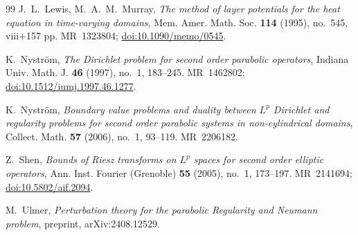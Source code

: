 \documentclass[12pt,leqno]{amsart}
\numberwithin{equation}{section}
\theoremstyle{plain}
\theoremstyle{remark}
\begin{document}
\begin{thebibliography}{99}
 J.~L.~Lewis, M.~A.~M.~Murray, \emph{The method of layer potentials
for the heat equation in time-varying domains}, Mem. Amer. Math. Soc.
\textbf{114} (1995), no.~545, viii+157 pp. MR~1323804;
\href{https://doi.org/10.1090/memo/0545}{doi:10.1090/memo/0545}.

 K.~Nystr\"om, \emph{The Dirichlet problem for second order
parabolic operators}, Indiana Univ. Math. J. \textbf{46} (1997), no.~1,
183--245. MR~1462802;
\href{https://doi.org/10.1512/iumj.1997.46.1277}{doi:10.1512/iumj.1997.46.1277}.

 K.~Nystr\"om, \emph{Boundary value problems and duality
between $L^p$ Dirichlet and regularity problems for second order parabolic
systems in non-cylindrical domains}, Collect. Math. \textbf{57} (2006), no.~1,
93--119. MR~2206182.

 Z.~Shen, \emph{Bounds of Riesz transforms on $L^p$ spaces for
second order elliptic operators}, Ann. Inst. Fourier (Grenoble) \textbf{55}
(2005), no.~1, 173--197. MR~2141694;
\href{https://doi.org/10.5802/aif.2094}{doi:10.5802/aif.2094}.

 M.~Ulmer, \emph{Perturbation theory for the parabolic Regularity
and Neumann problem}, preprint, arXiv:2408.12529.

\end{thebibliography}
\end{document}
